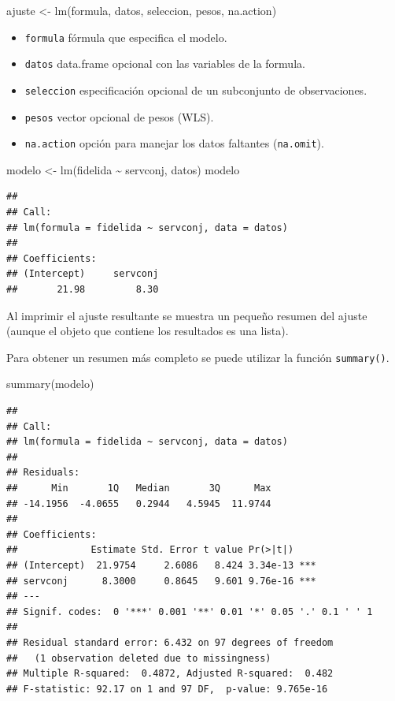\documentclass[
]{book}
\newenvironment{Shaded}{\begin{snugshade}}{\end{snugshade}}
\newcommand{\FunctionTok}[1]{\textcolor[rgb]{0.00,0.00,0.00}{#1}}
\newcommand{\NormalTok}[1]{#1}
\newcommand{\OtherTok}[1]{\textcolor[rgb]{0.56,0.35,0.01}{#1}}
\newcommand{\SpecialCharTok}[1]{\textcolor[rgb]{0.00,0.00,0.00}{#1}}
\providecommand{\tightlist}{%
  \setlength{\itemsep}{0pt}\setlength{\parskip}{0pt}}
\theoremstyle{break}
\begin{document}
\begin{Shaded}
\begin{Highlighting}[]
\NormalTok{ajuste }\OtherTok{\textless{}{-}} \FunctionTok{lm}\NormalTok{(formula, datos, seleccion, pesos, na.action)}
\end{Highlighting}
\end{Shaded}

\begin{itemize}
\tightlist
\item
  \texttt{formula} fórmula que especifica el modelo.
\item
  \texttt{datos} data.frame opcional con las variables de la formula.
\item
  \texttt{seleccion} especificación opcional de un subconjunto de observaciones.
\item
  \texttt{pesos} vector opcional de pesos (WLS).
\item
  \texttt{na.action} opción para manejar los datos faltantes (\texttt{na.omit}).
\end{itemize}

\begin{Shaded}
\begin{Highlighting}[]
\NormalTok{modelo }\OtherTok{\textless{}{-}} \FunctionTok{lm}\NormalTok{(fidelida }\SpecialCharTok{\textasciitilde{}}\NormalTok{ servconj, datos)}
\NormalTok{modelo}
\end{Highlighting}
\end{Shaded}

\begin{verbatim}
## 
## Call:
## lm(formula = fidelida ~ servconj, data = datos)
## 
## Coefficients:
## (Intercept)     servconj  
##       21.98         8.30
\end{verbatim}

Al imprimir el ajuste resultante se muestra un pequeño resumen del ajuste (aunque el objeto que contiene los resultados es una lista).

Para obtener un resumen más completo se puede utilizar la función \texttt{summary()}.

\begin{Shaded}
\begin{Highlighting}[]
\FunctionTok{summary}\NormalTok{(modelo)}
\end{Highlighting}
\end{Shaded}

\begin{verbatim}
## 
## Call:
## lm(formula = fidelida ~ servconj, data = datos)
## 
## Residuals:
##      Min       1Q   Median       3Q      Max 
## -14.1956  -4.0655   0.2944   4.5945  11.9744 
## 
## Coefficients:
##             Estimate Std. Error t value Pr(>|t|)    
## (Intercept)  21.9754     2.6086   8.424 3.34e-13 ***
## servconj      8.3000     0.8645   9.601 9.76e-16 ***
## ---
## Signif. codes:  0 '***' 0.001 '**' 0.01 '*' 0.05 '.' 0.1 ' ' 1
## 
## Residual standard error: 6.432 on 97 degrees of freedom
##   (1 observation deleted due to missingness)
## Multiple R-squared:  0.4872, Adjusted R-squared:  0.482 
## F-statistic: 92.17 on 1 and 97 DF,  p-value: 9.765e-16
\end{verbatim}
\end{document}

